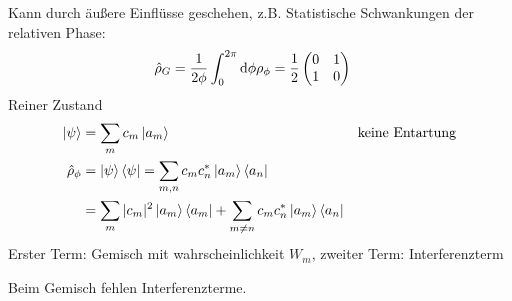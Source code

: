 	Kann durch äußere Einflüsse geschehen, z.B. Statistische Schwankungen der relativen Phase:
		\begin{align*}
			\hat{\rho}_G &= \frac{1}{2 \phi} 
			\int_{0}^{2 \pi} \mathrm{d} \phi \rho_\phi = \frac{1}{2} 
			\begin{pmatrix}
				0 & 1 \\
				1 & 0 
			\end{pmatrix} 
		\end{align*}
	Reiner Zustand
		\begin{align*}
			\ket{\psi} &= \sum_m c_m \ket{a_m} & &\text{keine Entartung}\\
			\hat{\rho}_\phi &= \ket{\psi} \bra{\psi} = 
			\sum_{m, n} c_m c_n^* \ket{a_m} \bra{a_n} \\
			&= \sum_m |c_m|^2 \ket{a_m} \bra{a_m} + \sum_{m \neq n} c_m c_n^* \ket{a_m} \bra{a_n}
		\end{align*}
	Erster Term: Gemisch mit wahrscheinlichkeit $W_m$, zweiter Term: Interferenzterm
	
	Beim Gemisch fehlen Interferenzterme.
